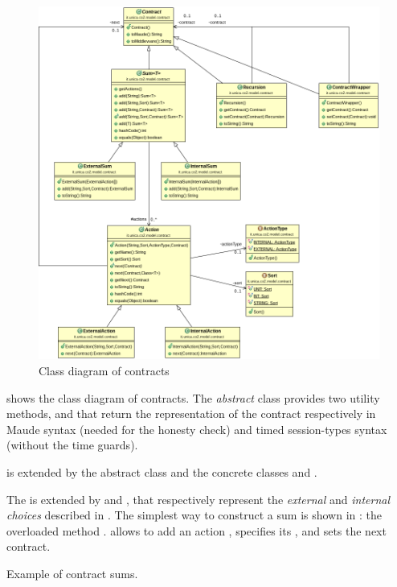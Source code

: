 \begin{figure}
	\centering
	\includegraphics[scale=0.4]{img/class-diag/contracts.png}
	\caption{Class diagram of contracts}
	\label{fig:class-diag-contracts}
\end{figure}

 shows the class diagram of contracts. The \textit{abstract} class  provides two utility methods,  and  that return the  representation of the contract respectively in Maude syntax (needed for the honesty check) and timed session-types syntax (without the time guards).

 is extended by the abstract class  and the concrete classes  and . 

The  is extended by  and , that respectively represent the \textit{external} and \textit{internal choices} described in .
The simplest way to construct a sum is shown in : the overloaded method . allows to add an action , specifies its , and sets the next contract. %
%
\begin{listing}
	\caption{Example of contract sums.}
	\label{lst:contract-sum}
\end{listing}

